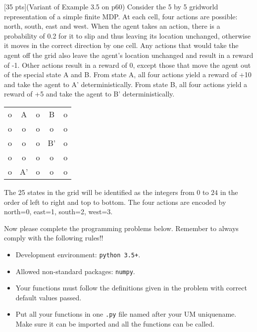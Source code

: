 
[35 pts](Variant of Example 3.5 on p60)
Consider the 5 by 5 gridworld representation of
a simple finite MDP. At each cell, four actions are possible: north, south, east
and west. When the agent takes an action, there is a probability of 0.2 for it
to slip and thus leaving its location unchanged, otherwise it moves in the correct
direction by one cell. Any actions that would take the agent off the grid
also leave the agent's location unchanged and result in a reward of -1.
Other actions result in a reward of 0, except those that move the agent out
of the special state A and B. From state A, all four actions yield a reward of
+10 and take the agent to A' deterministically. From state B, all four actions
yield a reward of +5 and take the agent to B' deterministically.
\begin{center}
    \begin{tabular}{ccccc}
      o & A  & o & B  & o\\
      o & o  & o & o  & o\\
      o & o  & o & B' & o\\
      o & o  & o & o  & o\\
      o & A' & o & o  & o\\
    \end{tabular}
\end{center}
The 25 states in the grid will be identified as the integers
from $ 0 $ to $ 24 $ in the order of left to right and top to bottom.
The four actions are encoded by north=0, east=1, south=2, west=3.

Now please complete the programming problems below. Remember to always comply with
the following rules!!
\begin{itemize}
  \item Development environment: \texttt{python 3.5+}.
  \item Allowed non-standard packages: \texttt{numpy}.
  \item Your functions must follow the definitions given in the
  problem with correct default values passed.
  \item Put all your functions in one \texttt{.py} file named after your UM
  uniquename. Make sure it can be imported and all the functions can be
  called.
\end{itemize}

